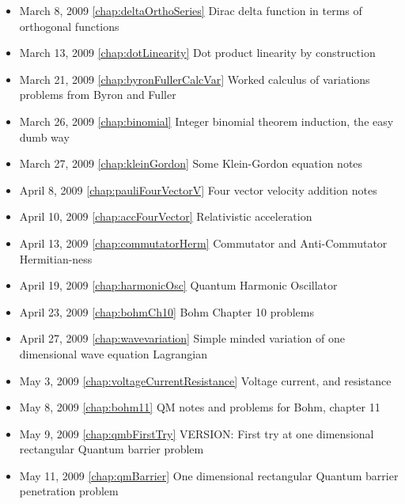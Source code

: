 \begin{itemize}
\item March 8, 2009 \ref{chap:deltaOrthoSeries} Dirac delta function in terms of orthogonal functions

\item March 13, 2009 \ref{chap:dotLinearity} Dot product linearity by construction

\item March 21, 2009 \ref{chap:byronFullerCalcVar} Worked calculus of variations problems from Byron and Fuller

\item March 26, 2009 \ref{chap:binomial} Integer binomial theorem induction, the easy dumb way

\item March 27, 2009 \ref{chap:kleinGordon} Some Klein-Gordon equation notes

\item April 8, 2009 \ref{chap:pauliFourVectorV} Four vector velocity addition notes

\item April 10, 2009 \ref{chap:accFourVector} Relativistic acceleration

\item April 13, 2009 \ref{chap:commutatorHerm} Commutator and Anti-Commutator Hermitian-ness

\item April 19, 2009 \ref{chap:harmonicOsc} Quantum Harmonic Oscillator

\item April 23, 2009 \ref{chap:bohmCh10} Bohm Chapter 10 problems

\item April 27, 2009 \ref{chap:wavevariation} Simple minded variation of one dimensional wave equation Lagrangian

\item May 3, 2009 \ref{chap:voltageCurrentResistance} Voltage current, and resistance

\item May 8, 2009 \ref{chap:bohm11} QM notes and problems for Bohm, chapter 11

\item May 9, 2009 \ref{chap:qmbFirstTry} VERSION: First try at one dimensional rectangular Quantum barrier problem

\item May 11, 2009 \ref{chap:qmBarrier} One dimensional rectangular Quantum barrier penetration problem

\end{itemize}
